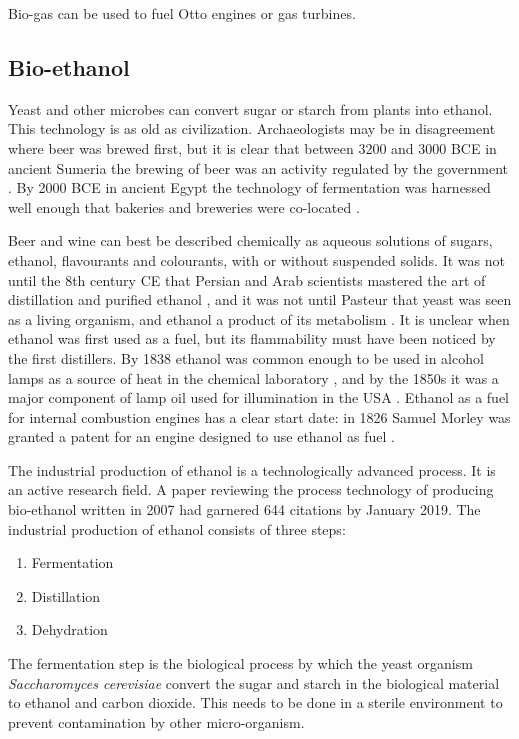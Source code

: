 Bio-gas can be used to fuel Otto engines or gas turbines. 

\subsection{Bio-ethanol}
\label{sec:BioEthanol}
Yeast and other microbes can convert sugar or starch from plants into ethanol.
This technology is as old as civilization. Archaeologists may be in disagreement
where beer was brewed first, but it is clear that between 3200 and 3000 BCE in
ancient Sumeria the brewing of beer was an activity regulated by the government
\autocite{Damerow2012}. By 2000 BCE in ancient Egypt the technology of
fermentation was harnessed well enough that bakeries and breweries were
co-located \autocite{1920}.

Beer and wine can best be described chemically as aqueous solutions of sugars,
ethanol, flavourants and colourants, with or without suspended solids. It was
not until the 8th century CE that Persian and Arab scientists mastered the art
of distillation and purified ethanol \autocite{Modanlou2008}, and it was not
until Pasteur that yeast was seen as a living organism, and ethanol a product of
its metabolism \autocite{Barnett2000}. It is unclear when ethanol was first used
as a fuel, but its flammability must have been noticed by the first distillers.
By 1838 ethanol was common enough to be used in alcohol lamps as a source of
heat in the chemical laboratory \autocite{Griffin1838}, and by the 1850s it was
a major component of lamp oil used for illumination in the USA
\autocite{Abebe2008}. Ethanol as a fuel for internal combustion engines has a
clear start date: in 1826 Samuel Morley was granted a patent for an engine
designed to use ethanol as fuel \autocite[p. 79]{Cummins1989}.

The industrial production of ethanol is a technologically advanced process. It
is an active research field. A paper \autocite{Cardona2007} reviewing the
process technology of producing bio-ethanol written in 2007 had garnered 644
citations by January 2019. The industrial production of ethanol consists of
three steps:

\begin{enumerate}
  \item Fermentation
  \item Distillation
  \item Dehydration
\end{enumerate} 

The fermentation step is the biological process by which the yeast organism
\textit{Saccharomyces cerevisiae} convert the sugar and starch in the biological
material to ethanol and carbon dioxide. This needs to be done in a sterile
environment to prevent contamination by other micro-organism.

